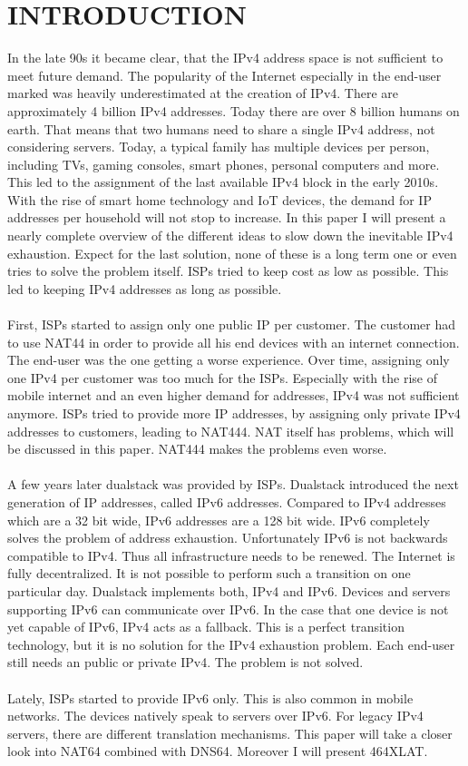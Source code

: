 \documentclass[format=sigconf, natbib=true, nonacm=true]{acmart}
\begin{document}
    \section{INTRODUCTION}
    In the late 90s it became clear, that the IPv4 address space is not sufficient to meet future demand. The popularity of the Internet especially in the end-user marked was heavily underestimated at the creation of IPv4. There are approximately 4 billion IPv4 addresses. Today there are over 8 billion humans on earth. That means that two humans need to share a single IPv4 address, not considering servers. Today, a typical family has multiple devices per person, including TVs, gaming consoles, smart phones, personal computers and more. This led to the assignment of the last available IPv4 block in the early 2010s. With the rise of smart home technology and IoT devices, the demand for IP addresses per household will not stop to increase. In this paper I will present a nearly complete overview of the different ideas to slow down the inevitable IPv4 exhaustion. Expect for the last solution, none of these is a long term one or even tries to solve the problem itself. ISPs tried to keep cost as low as possible. This led to keeping IPv4 addresses as long as possible.\\\\First, ISPs started to assign only one public IP per customer. The customer had to use NAT44 in order to provide all his end devices with an internet connection. The end-user was the one getting a worse experience. Over time, assigning only one IPv4 per customer was too much for the ISPs. Especially with the rise of mobile internet and an even higher demand for addresses, IPv4 was not sufficient anymore. ISPs tried to provide more IP addresses, by assigning only private IPv4 addresses to customers, leading to NAT444. NAT itself has problems, which will be discussed in this paper. NAT444 makes the problems even worse.\\\\A few years later dualstack was provided by ISPs. Dualstack introduced the next generation of IP addresses, called IPv6 addresses. Compared to IPv4 addresses which are a 32 bit wide, IPv6 addresses are a 128 bit wide. IPv6 completely solves the problem of address exhaustion. Unfortunately IPv6 is not backwards compatible to IPv4. Thus all infrastructure needs to be renewed. The Internet is fully decentralized. It is not possible to perform such a transition on one particular day. Dualstack implements both, IPv4 and IPv6. Devices and servers supporting IPv6 can communicate over IPv6. In the case that one device is not yet capable of IPv6, IPv4 acts as a fallback. This is a perfect transition technology, but it is no solution for the IPv4 exhaustion problem. Each end-user still needs an public or private IPv4. The problem is not solved.\\\\Lately, ISPs started to provide IPv6 only. This is also common in mobile networks. The devices natively speak to servers over IPv6. For legacy IPv4 servers, there are different translation mechanisms. This paper will take a closer look into NAT64 combined with DNS64. Moreover I will present 464XLAT. 
\end{document}
